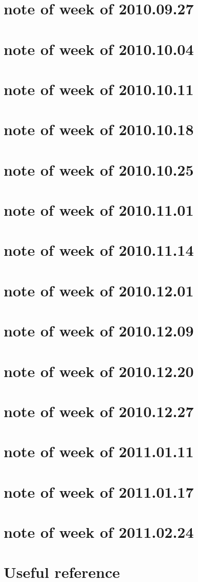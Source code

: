 \documentclass{article}
\begin{document}
\section{note of week of 2010.09.27}

\section{note of week of 2010.10.04}

\section{note of week of 2010.10.11}

\section{note of week of 2010.10.18}

\section{note of week of 2010.10.25}

\section{note of week of 2010.11.01}

\section{note of week of 2010.11.14}

\section{note of week of 2010.12.01}

\section{note of week of 2010.12.09}

\section{note of week of 2010.12.20}

\section{note of week of 2010.12.27}


\section{note of week of 2011.01.11}





\section{note of week of 2011.01.17}

\section{note of week of 2011.02.24}



\appendix
\section{Useful reference}

\printindex

%

\end{document}
